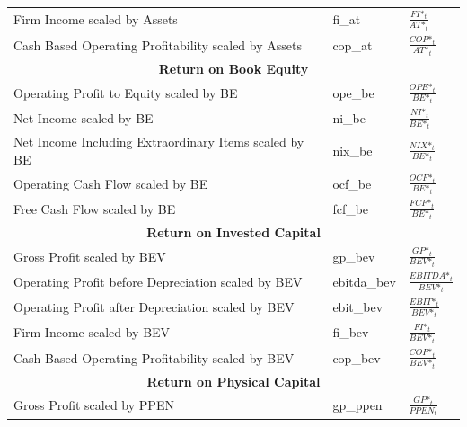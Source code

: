 \documentclass[12pt,title,fleqn]{article}
\begin{document}
{\begin{longtable}{@{\extracolsep{\fill}}|p{6cm}|l|p{8cm}|@{}}
	Firm Income scaled by Assets & fi\_at &$\frac{FI\mbox{*}_t}{AT\mbox{*}_t}$\\
	
	Cash Based Operating Profitability scaled by Assets & cop\_at &$\frac{COP\mbox{*}_t}{AT\mbox{*}_t}$ \\
	
	\hline 
	\multicolumn{3}{|c|}{\textbf{Return on Book Equity}} \\
	\hline 	
	
	Operating Profit to Equity scaled by BE & ope\_be &$\frac{OPE\mbox{*}_t}{BE\mbox{*}_t}$\\
	
	Net Income scaled by BE & ni\_be &$\frac{NI\mbox{*}_t}{BE\mbox{*}_t}$\\
	
	Net Income Including Extraordinary Items scaled by BE & nix\_be &$\frac{NIX\mbox{*}_t}{BE\mbox{*}_t}$\\
	
	Operating Cash Flow scaled by BE & ocf\_be &$\frac{OCF\mbox{*}_t}{BE\mbox{*}_t}$\\
	
	Free Cash Flow scaled by BE & fcf\_be &$\frac{FCF\mbox{*}_t}{BE\mbox{*}_t}$\\
	
	\hline 
	\multicolumn{3}{|c|}{\textbf{Return on Invested Capital}} \\
	\hline 	
	
	Gross Profit scaled by BEV & gp\_bev & $\frac{GP\mbox{*}_t}{BEV\mbox{*}_t}$ \\
	
	Operating Profit before Depreciation scaled by BEV & ebitda\_bev & $\frac{EBITDA\mbox{*}_t}{BEV\mbox{*}_t}$\\
    
    Operating Profit after Depreciation scaled by BEV & ebit\_bev &$ \frac{EBIT\mbox{*}_t}{BEV\mbox{*}_t}$ \\
    
    Firm Income scaled by BEV & fi\_bev &$\frac{FI\mbox{*}_t}{BEV\mbox{*}_t}$\\
    
	Cash Based Operating Profitability scaled by BEV & cop\_bev &$ \frac{COP\mbox{*}_t}{BEV\mbox{*}_t}$ \\
	
    \hline 
	\multicolumn{3}{|c|}{\textbf{Return on Physical Capital}} \\
	\hline 		
	
	Gross Profit scaled by PPEN & gp\_ppen &$\frac{GP\mbox{*}_t}{PPEN_t}$\\
    

\end{longtable}}
\end{document}
